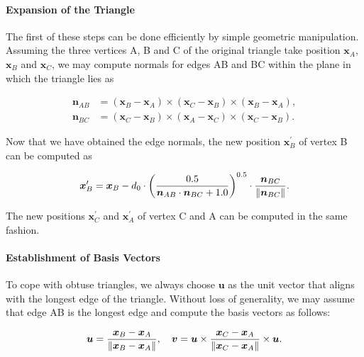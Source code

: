 \documentclass[
	11pt, 
	DIV10,
	ngerman,
	a4paper, 
	oneside, 
	headings=normal, 
	captions=tableheading,
	final, 
	numbers=noenddot
]{scrartcl}
\DeclarePairedDelimiter{\norm}{\lVert}{\rVert}
\begin{document}
\paragraph{Expansion of the Triangle} The first of these steps can be done efficiently by simple geometric manipulation. Assuming the three vertices A, B and C of the original triangle take position $ \boldsymbol{x}_{A} $, $ \boldsymbol{x}_{B} $ and $ \boldsymbol{x}_{C} $, we may compute normals for edges AB and BC within the plane in which the triangle lies as

\begin{equation}
\begin{split}
	\label{eq5}
	\boldsymbol{n}_{AB} &= \left(\boldsymbol{x}_{B} - \boldsymbol{x}_{A}\right) \times \left(\boldsymbol{x}_{C} - \boldsymbol{x}_{B}\right) \times \left(\boldsymbol{x}_{B} - \boldsymbol{x}_{A}\right), \\[1em]
	\boldsymbol{n}_{BC} &= \left(\boldsymbol{x}_{C} - \boldsymbol{x}_{B}\right) \times \left(\boldsymbol{x}_{A} - \boldsymbol{x}_{C}\right) \times \left(\boldsymbol{x}_{C} - \boldsymbol{x}_{B}\right).
\end{split}
\end{equation}

Now that we have obtained the edge normals, the new position $ \boldsymbol{x}_{B}^{\prime} $ of vertex B can be computed as

\begin{equation}
	\label{eq6}
	\boldsymbol{x}_{B}^{\prime} = \boldsymbol{x}_{B} - d_{0} \cdot \left(\frac{0.5}{\boldsymbol{n}_{AB} \cdot \boldsymbol{n}_{BC} + 1.0}\right)^{0.5} \cdot \frac{\boldsymbol{n}_{BC}}{\norm{\boldsymbol{n}_{BC}}}.
\end{equation}

The new positions $ \boldsymbol{x}_{C}^{\prime} $ and $ \boldsymbol{x}_{A}^{\prime} $ of vertex C and A can be computed in the same fashion.

\paragraph{Establishment of Basis Vectors} To cope with obtuse triangles, we always choose $ \boldsymbol{u} $ as the unit vector that aligns with the longest edge of the triangle. Without loss of generality, we may assume that edge AB is the longest edge and compute the basis vectors as follows:

\begin{equation}
	\label{eq7}
	\boldsymbol{u} = \frac{\boldsymbol{x}_{B} - \boldsymbol{x}_{A}}{\norm{\boldsymbol{x}_{B} - \boldsymbol{x}_{A}}}, \quad \boldsymbol{v} = \boldsymbol{u} \times \frac{\boldsymbol{x}_{C} - \boldsymbol{x}_{A}}{\norm{\boldsymbol{x}_{C} - \boldsymbol{x}_{A}}} \times \boldsymbol{u}.
\end{equation}
\end{document}
